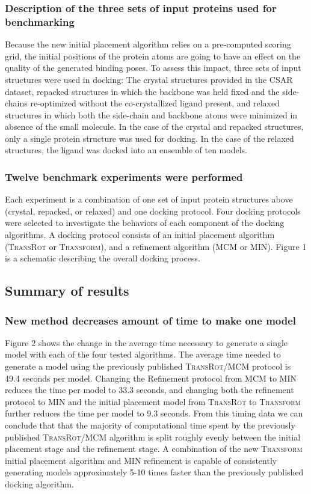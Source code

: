 \subsubsection{Description of the three sets of input proteins used for benchmarking}
Because the new initial placement algorithm relies on a pre-computed scoring grid, the initial positions of the protein atoms are going to have an effect on the quality of the generated binding poses.
To assess this impact, three sets of input structures were used in docking: The crystal structures provided in the CSAR dataset, repacked structures in which the backbone was held fixed and the side-chains re-optimized without the co-crystallized ligand present, and relaxed structures in which both the side-chain and backbone atoms were minimized in absence of the small molecule.
In the case of the crystal and repacked structures, only a single protein structure was used for docking. In the case of the relaxed structures, the ligand was docked into an ensemble of ten models. 

\subsubsection{Twelve benchmark experiments were performed}
Each experiment is a combination of one set of input protein structures above (crystal, repacked, or relaxed) and one docking protocol.
Four docking protocols were selected to investigate the behaviors of each component of the docking algorithms.
A docking protocol consists of an initial placement algorithm (\textsc{TransRot} or \textsc{Transform}), and a refinement algorithm (MCM or MIN).
Figure 1 is a schematic describing the overall docking process. 

\subsection{Summary of results}
\subsubsection{New method decreases amount of time to make one model}
Figure 2 shows the change in the average time necessary to generate a single model with each of the four tested algorithms.
The average time needed to generate a model using the previously published \textsc{TransRot}/MCM protocol is 49.4 seconds per model.
Changing the Refinement protocol from MCM to MIN reduces the time per model to 33.3 seconds, and changing both the refinement protocol to MIN and the initial placement model from \textsc{TransRot} to \textsc{Transform} further reduces the time per model to 9.3 seconds.
From this timing data we can conclude that that the majority of computational time spent by the previously published \textsc{TransRot}/MCM algorithm is split roughly evenly between the initial placement stage and the refinement stage.
A combination of the new \textsc{Transform} initial placement algorithm and MIN refinement is capable of consistently generating models approximately 5-10 times faster than the previously published docking algorithm.

